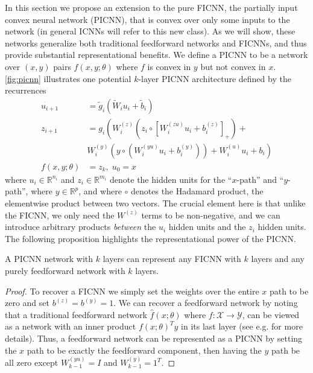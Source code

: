 In this section we propose an extension to the pure FICNN, the partially
input convex neural network (PICNN), that is convex over only some inputs to the
network (in general ICNNs will refer to this new class). As we will show, these
networks generalize both
traditional feedforward networks and FICNNs, and thus provide substantial
representational benefits.  We define a PICNN to be a network over $(x,y)$ pairs
$f(x,y;\theta)$ where $f$ is convex in $y$ but not convex in $x$.
\cref{fig:picnn} illustrates one potential $k$-layer PICNN architecture
defined by the recurrences
\begin{equation}
\begin{split}
u_{i+1} & = \tilde{g}_i(\tilde{W}_i u_i + \tilde{b}_i) \\
z_{i+1} & = g_i \left( W^{(z)}_i \left (z_i \circ [W_i^{(zu)} u_i + b^{
      (z)}_i]_+ \right ) + \right. \\
  & \left. W^{(y)}_i \left (y \circ (W_i^{(yu)} u_i + b^{(y)}_i)\right)  + W^{(u)}_i
u_i + b_i \right ) \\
f(x,y;\theta) & = z_k, \; u_0 = x
\end{split}
\end{equation}
where $u_i \in \mathbb{R}^{n_i}$ and $z_i \in \mathbb{R}^{m_i}$ denote
the hidden units for the ``$x$-path'' and ``$y$-path'', where $y \in
\mathbb{R}^p$, and where $\circ$ denotes the Hadamard product, the
elementwise product between two vectors.  The crucial element here is that
unlike the FICNN, we only need the $W^{(z)}$ terms to be non-negative, and we
can introduce arbitrary products \emph{between} the $u_i$ hidden units and the
$z_i$ hidden units.
The following proposition highlights the representational
power of the PICNN.
\begin{proposition}
A PICNN network with $k$ layers can represent any FICNN with $k$ layers and any
purely feedforward network with $k$ layers.
\end{proposition}
\begin{proof}
To recover a FICNN we simply set the weights over the entire $x$ path to be
zero and set $b^{(z)} = b^{(y)} = 1$.  We can recover a feedforward network by
noting that a traditional feedforward network $\hat{f}(x;\theta)$ where $f :
\mathcal{X} \rightarrow \mathcal{Y}$,
can be viewed as a network with an inner
product $f(x;\theta)^T y$ in its last layer
(see e.g. \citet{lecun2006tutorial} for more details).
Thus, a feedforward network can be represented as a PICNN
by setting the $x$ path to be exactly the feedforward component, then having the
$y$ path be all zero except $W_{k-1}^{(yu)} = I$ and $W^{(y)}_{k-1} = 1^T$.
\end{proof}

